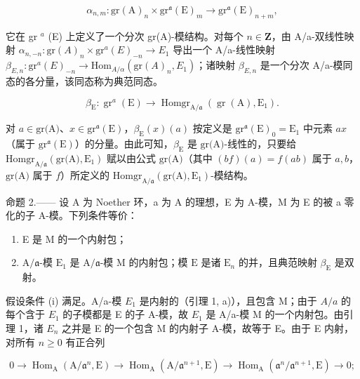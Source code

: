 \[
\alpha_ {n, m}: \mathrm{gr} (\mathrm{A}) _ {n} \times \mathrm{gr} ^ {\mathfrak {a}} (\mathrm{E}) _ {m} \longrightarrow \mathrm{gr} ^ {\mathfrak {a}} (\mathrm{E}) _ {n + m},\tag{1}
\]

它在 gr \(^{a}\) (E) 上定义了一个分次 gr(A)-模结构。对每个 \(n \in \mathbf{Z}\)，由 A/a-双线性映射 \(\alpha_{n,-n} : \text{gr}(A)_n \times \text{gr}^{a}(E)_{-n} \longrightarrow E_1\) 导出一个 A/a-线性映射 \(\beta_{E,n} : \text{gr}^{a}(E)_{-n} \longrightarrow \text{Hom}_{A/\alpha}(\text{gr}(A)_n, E_1)\)；诸映射 \(\beta_{E,n}\) 是一个分次 A/a-模同态的各分量，该同态称为典范同态。

\[
\beta_ {\mathrm{E}}: \operatorname{gr} ^ {a} (\mathrm{E}) \longrightarrow \operatorname{Homgr} _ {\mathrm{A} / \mathfrak{a}} (\operatorname{gr} (\mathrm{A}), \mathrm{E} _ {1}).\tag{2}
\]

对 \(a \in \text{gr(A)}\)、\(x \in \text{gr}^{\mathfrak{a}}(\text{E})\)，\(\beta_{\text{E}}(x)(a)\) 按定义是 \(\text{gr}^{\mathfrak{a}}(\text{E})_0 = \text{E}_1\) 中元素 \(ax\)（属于 \(\text{gr}^{\mathfrak{a}}(\text{E})\)）的分量。由此可知，\(\beta_{\text{E}}\) 是 \(\text{gr(A)}\)-线性的，只要给 \(\text{Homgr}_{\text{A}/\mathfrak{a}}(\text{gr(A)}, \text{E}_1)\) 赋以由公式 \(\text{gr(A)}\)（其中 \((bf)(a) = f(ab)\) 属于 \(a, b\)，\(\text{gr(A)}\) 属于 \(f\)）所定义的 \(\text{Homgr}_{\text{A}/\mathfrak{a}}(\text{gr(A)}, \text{E}_1)\)-模结构。

命题 2.—— 设 A 为 Noether 环，a 为 A 的理想，E 为 A-模，M 为 E 的被 a 零化的子 A-模。下列条件等价：

\begin{enumerate}
\def\labelenumi{(\roman{enumi})}
\item
  E 是 M 的一个内射包；
\item
  \(\mathrm{A}/\mathfrak{a}\)-模 \(\mathrm{E}_1\) 是 \(\mathrm{A}/\mathfrak{a}\)-模 \(\mathrm{M}\) 的内射包；模 \(\mathrm{E}\) 是诸 \(\mathrm{E}_n\) 的并，且典范映射 \(\beta_{\mathrm{E}}\) 是双射。
\end{enumerate}

假设条件 (i) 满足。A/a-模 \(E_{1}\) 是内射的（引理 1, a)），且包含 M；由于 \(A/a\) 的每个含于 \(E_{1}\) 的子模都是 E 的子 A-模，故 \(E_{1}\) 是 A/a-模 M 的一个内射包。由引理 1，诸 \(E_{n}\) 之并是 E 的一个包含 M 的内射子 A-模，故等于 E。由于 E 内射，对所有 \(n \geqslant 0\) 有正合列

\[
0 \to \operatorname{Hom} _ {\mathrm{A}} (\mathrm{A} / \mathfrak {a} ^ {n}, \mathrm{E}) \longrightarrow \operatorname{Hom} _ {\mathrm{A}} (\mathrm{A} / \mathfrak {a} ^ {n + 1}, \mathrm{E}) \longrightarrow \operatorname{Hom} _ {\mathrm{A}} (\mathfrak {a} ^ {n} / \mathfrak {a} ^ {n + 1}, \mathrm{E}) \to 0;
\]

